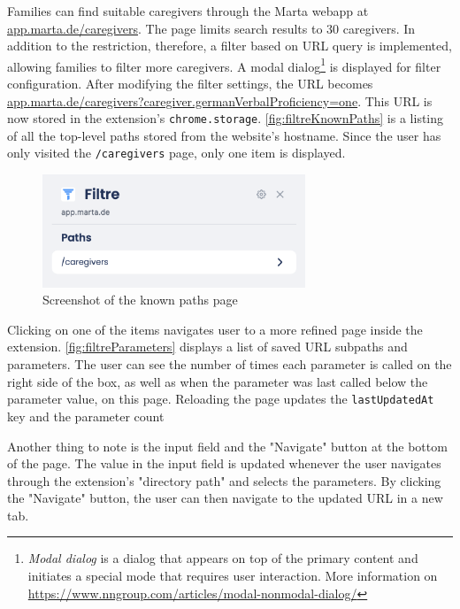 Families can find suitable caregivers through the Marta webapp at \url{app.marta.de/caregivers}. The page limits search results to 30 caregivers. In addition to the restriction, therefore, a filter based on URL query is implemented, allowing families to filter more caregivers. A modal dialog\footnote{\emph{Modal dialog} is a dialog that appears on top of the primary content and initiates a special mode that requires user interaction. More information on \url{https://www.nngroup.com/articles/modal-nonmodal-dialog/}} is displayed for filter configuration. After modifying the filter settings, the URL becomes \url{app.marta.de/caregivers?caregiver.germanVerbalProficiency=one}. This URL is now stored in the extension's \texttt{chrome.storage}. \autoref{fig:filtreKnownPaths} is a listing of all the top-level paths stored from the website's hostname. Since the user has only visited the \texttt{/caregivers} page, only one item is displayed.

\begin{figure}[H]
  \centering
  \includegraphics[width=0.7\textwidth]{assets/screenshot_filtre_known_paths.png}
  \caption{Screenshot of the known paths page}
  \label{fig:filtreKnownPaths}
\end{figure}

Clicking on one of the items navigates user to a more refined page inside the extension. \autoref{fig:filtreParameters} displays a list of saved URL subpaths and parameters. The user can see the number of times each parameter is called on the right side of the box, as well as when the parameter was last called below the parameter value, on this page. Reloading the page updates the \texttt{lastUpdatedAt} key and the parameter count

Another thing to note is the input field and the "Navigate" button at the bottom of the page. The value in the input field is updated whenever the user navigates through the extension's "directory path" and selects the parameters. By clicking the "Navigate" button, the user can then navigate to the updated URL in a new tab.

